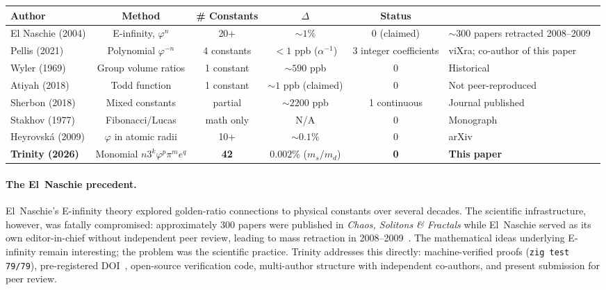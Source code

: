 \documentclass[10pt,a4paper]{article}
\begin{document}
\begin{table}[ht]
\centering
\begin{tabular}{l c c c c}
\toprule
\textbf{Author} & \textbf{Method} & \textbf{\# Constants} & $\Delta$ & \textbf{Status} \\
\midrule
El Naschie (2004) & E-infinity, $\varphi^n$ & 20+ & $\sim 1\%$ & 0 (claimed) & $\sim 300$ papers retracted 2008--2009~\cite{naschie2004} \\
Pellis (2021) & Polynomial $\varphi^{-n}$ & 4 constants & $<1$ ppb ($\alpha^{-1}$) & 3 integer coefficients & viXra; co-author of this paper~\cite{pellis2021} \\
Wyler (1969) & Group volume ratios & 1 constant & $\sim 590$ ppb & 0 & Historical~\cite{wyler1969} \\
Atiyah (2018) & Todd function & 1 constant & $\sim 1$ ppb (claimed) & 0 & Not peer-reproduced~\cite{atiyah2018} \\
Sherbon (2018) & Mixed constants & partial & $\sim 2200$ ppb & 1 continuous & Journal published~\cite{sherbon2018} \\
Stakhov (1977) & Fibonacci/Lucas & math only & N/A & 0 & Monograph~\cite{stakhov1977} \\
Heyrovsk\'{a} (2009) & $\varphi$ in atomic radii & 10+ & $\sim 0.1\%$ & 0 & arXiv~\cite{heyrovska2009} \\
\textbf{Trinity (2026)} & Monomial $n3^k\varphi^p\pi^m e^q$ & \textbf{42} & $\mathbf{0.002\%}$ ($m_s/m_d$) & \textbf{0} & \textbf{This paper~\cite{trinity2024}} \\
\bottomrule
\end{tabular}
\end{table}

\paragraph{The El~Naschie precedent.}
El~Naschie's E-infinity theory explored golden-ratio connections to physical constants over
several decades. The scientific infrastructure, however, was fatally compromised: approximately
300 papers were published in \textit{Chaos, Solitons \& Fractals} while El~Naschie served as
its own editor-in-chief without independent peer review, leading to mass retraction in
2008--2009~\cite{naschie2004}. The mathematical ideas underlying E-infinity remain interesting;
the problem was the scientific practice. Trinity addresses this directly: machine-verified proofs
(\texttt{zig test 79/79}), pre-registered DOI~\cite{trinity2024}, open-source verification code,
multi-author structure with independent co-authors, and present submission for peer review.
\end{document}
